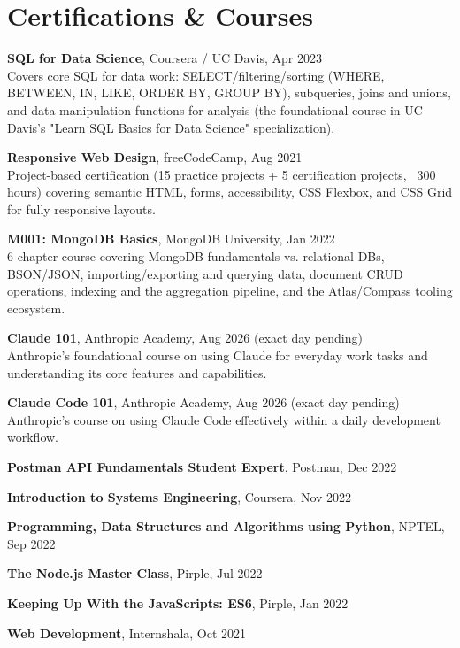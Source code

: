 \documentclass[letterpaper,11pt]{article}
\begin{document}
\section{Certifications \& Courses}
 \begin{itemize}[leftmargin=0.15in, label={}]
    \small{
      \item{\textbf{SQL for Data Science}, Coursera / UC Davis, Apr 2023 \\
        Covers core SQL for data work: SELECT/filtering/sorting (WHERE, BETWEEN, IN, LIKE, ORDER BY, GROUP BY), subqueries, joins and unions, and data-manipulation functions for analysis (the foundational course in UC Davis's "Learn SQL Basics for Data Science" specialization).}
      \item{\textbf{Responsive Web Design}, freeCodeCamp, Aug 2021 \\
        Project-based certification (15 practice projects + 5 certification projects, ~300 hours) covering semantic HTML, forms, accessibility, CSS Flexbox, and CSS Grid for fully responsive layouts.}
      \item{\textbf{M001: MongoDB Basics}, MongoDB University, Jan 2022 \\
        6-chapter course covering MongoDB fundamentals vs. relational DBs, BSON/JSON, importing/exporting and querying data, document CRUD operations, indexing and the aggregation pipeline, and the Atlas/Compass tooling ecosystem.}
      \item{\textbf{Claude 101}, Anthropic Academy, Aug 2026 (exact day pending) \\
        Anthropic's foundational course on using Claude for everyday work tasks and understanding its core features and capabilities.}
      \item{\textbf{Claude Code 101}, Anthropic Academy, Aug 2026 (exact day pending) \\
        Anthropic's course on using Claude Code effectively within a daily development workflow.}
      \item{\textbf{Postman API Fundamentals Student Expert}, Postman, Dec 2022}
      \item{\textbf{Introduction to Systems Engineering}, Coursera, Nov 2022}
      \item{\textbf{Programming, Data Structures and Algorithms using Python}, NPTEL, Sep 2022}
      \item{\textbf{The Node.js Master Class}, Pirple, Jul 2022}
      \item{\textbf{Keeping Up With the JavaScripts: ES6}, Pirple, Jan 2022}
      \item{\textbf{Web Development}, Internshala, Oct 2021}
    }
 \end{itemize}
\end{document}

